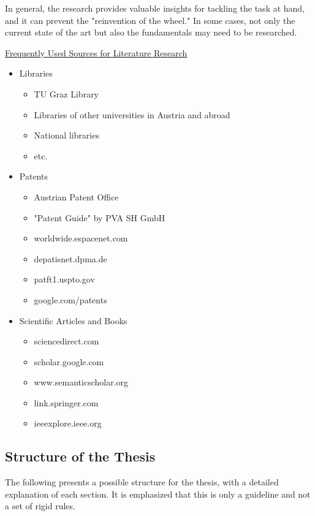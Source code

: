 \documentclass[a4paper, fleqn, headsepline, footsepline, 12pt, parskip=half]{scrartcl}
\begin{document}
In general, the research provides valuable insights for tackling the task at hand, and it can prevent the "reinvention of the wheel." In some cases, not only the current state of the art but also the fundamentals may need to be researched.

\underline{Frequently Used Sources for Literature Research}
\begin{itemize}
    \item Libraries
    \begin{itemize}
        \item TU Graz Library
        \item Libraries of other universities in Austria and abroad
        \item National libraries
        \item etc.
    \end{itemize}
    \item Patents
    \begin{itemize}
        \item Austrian Patent Office
        \item "Patent Guide" by PVA SH GmbH
        \item worldwide.espacenet.com
        \item depatisnet.dpma.de
        \item patft1.uspto.gov
        \item google.com/patents
    \end{itemize}
    \item Scientific Articles and Books
    \begin{itemize}
        \item sciencedirect.com
        \item scholar.google.com
        \item www.semanticscholar.org
        \item link.springer.com
        \item ieeexplore.ieee.org
    \end{itemize}    
\end{itemize}


\subsection{Structure of the Thesis}
\label{sec:structureOfThesis}

The following presents a possible structure for the thesis, with a detailed explanation of each section. It is emphasized that this is only a guideline and not a set of rigid rules.
\end{document}
